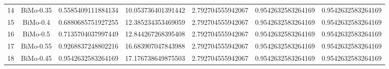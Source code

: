 \documentclass[a4paper,10pt]{article}
\begin{document}
\begin{landscape}
\begin{table}[!htp]
\begin{tabular}{ccccccc}
14&BiMo-0.35&0.5585409111884134&10.053736401391442&2.792704555942067&0.9542632583264169&0.9542632583264169\\
15&BiMo-0.4&0.6880685751927255&12.385234353469059&2.792704555942067&0.9542632583264169&0.9542632583264169\\
16&BiMo-0.5&0.7135704037997449&12.844267268395408&2.792704555942067&0.9542632583264169&0.9542632583264169\\
17&BiMo-0.55&0.9268837248802216&16.683907047843988&2.792704555942067&0.9542632583264169&0.9542632583264169\\
18&BiMo-0.45&0.9542632583264169&17.176738649875503&2.792704555942067&0.9542632583264169&0.9542632583264169\\
\hline
\end{tabular}
\end{table}


\end{landscape}
\end{document}
